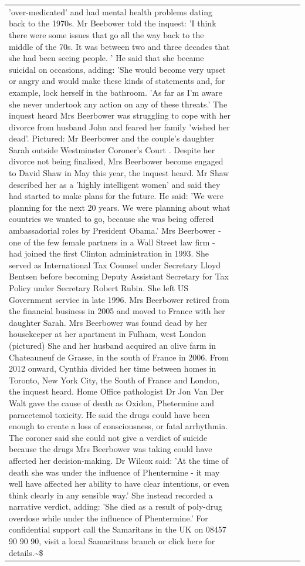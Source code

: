 \begin{table}[H]
\begin{tabular}{lllrlllll}
'over-medicated' and had mental health problems dating back to the 1970s. Mr Beebower told the inquest: 'I think there were some issues that go all the way back to the middle of the 70s. It was between two and three decades that she had been seeing people. ' He said that she became suicidal on occasions, adding: 'She would become very upset or angry and would make these kinds of statements and, for example, lock herself in the bathroom. 'As far as I'm aware she never undertook any action on any of these threats.' The inquest heard Mrs Beerbower was struggling to cope with her divorce from husband John and feared her family 'wished her dead'. Pictured: Mr Beerbower and the couple's daughter Sarah outside Westminster Coroner's Court . Despite her divorce not being finalised, Mrs Beerbower become engaged to David Shaw in May this year, the inquest heard. Mr Shaw described her as a 'highly intelligent women' and said they had started to make plans for the future. He said: 'We were planning for the next 20 years. We were planning about what countries we wanted to go, because she was being offered ambassadorial roles by President Obama.' Mrs Beerbower - one of the few female partners in a Wall Street law firm - had joined the first Clinton administration in 1993. She served as International Tax Counsel under Secretary Lloyd Bentsen before becoming Deputy Assistant Secretary for Tax Policy under Secretary Robert Rubin. She left US Government service in late 1996. Mrs Beerbower retired from the financial business in 2005 and moved to France with her daughter Sarah. Mrs Beerbower was found dead by her housekeeper at her apartment in Fulham, west London (pictured) She and her husband acquired an olive farm in Chateauneuf de Grasse, in the south of France in 2006. From 2012 onward, Cynthia divided her time between homes in Toronto, New York City, the South of France and London, the inquest heard. Home Office pathologist Dr Jon Van Der Walt gave the cause of death as Oxidon, Phetermine and paracetemol toxicity. He said the drugs could have been enough to create a loss of consciousness, or fatal arrhythmia. The coroner said she could not give a verdict of suicide because the drugs Mrs Beerbower was taking could have affected her decision-making. Dr Wilcox said: 'At the time of death she was under the influence of Phentermine - it may well have affected her ability to have clear intentions, or even think clearly in any sensible way.' She instead recorded a narrative verdict, adding: 'She died as a result of poly-drug overdose while under the influence of Phentermine.' For confidential support call the Samaritans in the UK on 08457 90 90 90, visit a local Samaritans branch or click here for details.\textasciitilde \$ \\

\end{tabular}
\end{table}
